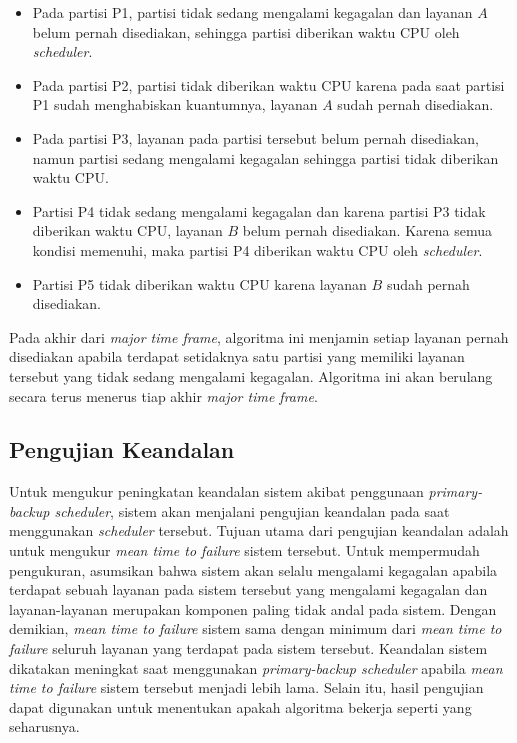 \begin{itemize}

	\item Pada partisi P1, partisi tidak sedang mengalami kegagalan dan
		layanan $A$ belum pernah disediakan, sehingga partisi diberikan waktu
		CPU oleh \textit{scheduler}.

	\item Pada partisi P2, partisi tidak diberikan waktu CPU karena pada saat partisi P1
		sudah menghabiskan kuantumnya, layanan $A$ sudah pernah disediakan.

	\item Pada partisi P3, layanan pada partisi tersebut belum pernah disediakan,
		namun partisi sedang mengalami kegagalan sehingga partisi tidak diberikan waktu
		CPU.

	\item Partisi P4 tidak sedang mengalami kegagalan dan karena partisi P3 tidak diberikan
		waktu CPU, layanan $B$ belum pernah disediakan. Karena semua kondisi
		memenuhi, maka partisi P4 diberikan waktu CPU oleh \textit{scheduler}.

	\item Partisi P5 tidak diberikan waktu CPU karena layanan $B$ sudah pernah
		disediakan.

\end{itemize}

Pada akhir dari \textit{major time frame}, algoritma ini menjamin setiap layanan pernah
disediakan apabila terdapat setidaknya satu partisi yang memiliki layanan tersebut yang
tidak sedang mengalami kegagalan. Algoritma ini akan berulang secara terus menerus tiap akhir
\textit{major time frame}.

\subsection{Pengujian Keandalan}

Untuk mengukur peningkatan keandalan sistem akibat penggunaan \textit{primary-backup scheduler},
sistem akan menjalani pengujian keandalan pada saat menggunakan \textit{scheduler} tersebut.
Tujuan utama dari pengujian keandalan adalah untuk mengukur \textit{mean time to failure} sistem
tersebut. Untuk mempermudah pengukuran, asumsikan bahwa sistem akan selalu mengalami kegagalan
apabila terdapat sebuah layanan pada sistem tersebut yang mengalami kegagalan dan
layanan-layanan merupakan komponen paling tidak andal pada sistem. Dengan demikian, \textit{mean
time to failure} sistem sama dengan minimum dari \textit{mean time to failure} seluruh layanan
yang terdapat pada sistem tersebut. Keandalan sistem dikatakan meningkat saat menggunakan
\textit{primary-backup scheduler} apabila \textit{mean time to failure} sistem tersebut menjadi
lebih lama. Selain itu, hasil pengujian dapat digunakan untuk menentukan apakah algoritma
bekerja seperti yang seharusnya.

